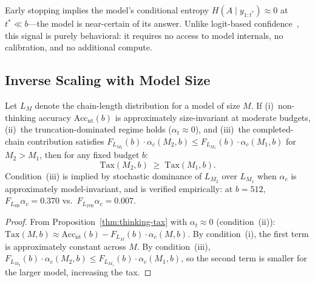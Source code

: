 \begin{remark}
Early stopping implies the model's conditional entropy
$H(A \mid y_{1:t^*}) \approx 0$ at $t^* \ll b$---the model is
near-certain of its answer.
Unlike logit-based confidence~\citep{kadavath2022language}, this signal
is purely behavioral: it requires no access to model internals,
no calibration, and no additional compute.
\end{remark}

\subsection{Inverse Scaling with Model Size}
\label{sec:theory:scaling}

\begin{proposition}
\label{prop:inverse-scaling}
Let $L_M$ denote the chain-length distribution for a model of size $M$.
If (i)~non-thinking accuracy $\mathrm{Acc}_{\mathrm{nt}}(b)$ is approximately
size-invariant at moderate budgets,
(ii)~the truncation-dominated regime holds ($\alpha_t \approx 0$),
and (iii)~the completed-chain contribution satisfies
$F_{L_{M_2}}(b) \cdot \alpha_c(M_2, b) \le F_{L_{M_1}}(b) \cdot \alpha_c(M_1, b)$
for $M_2 > M_1$,
then for any fixed budget $b$:
\begin{equation}
  \mathrm{Tax}(M_2, b) \;\ge\; \mathrm{Tax}(M_1, b).
  \label{eq:inverse-scaling}
\end{equation}
Condition~(iii) is implied by stochastic dominance of $L_{M_2}$ over $L_{M_1}$
when $\alpha_c$ is approximately model-invariant, and is verified
empirically: at $b{=}512$,
$F_{L_{\text{8B}}} \alpha_c = 0.370$ vs.\
$F_{L_{\text{27B}}} \alpha_c = 0.007$.
\end{proposition}

\begin{proof}
From Proposition~\ref{thm:thinking-tax} with $\alpha_t \approx 0$ (condition~(ii)):
$\mathrm{Tax}(M, b) \approx \mathrm{Acc}_{\mathrm{nt}}(b) -
F_{L_M}(b) \cdot \alpha_c(M, b)$.
By condition~(i), the first term is approximately constant across $M$.
By condition~(iii),
$F_{L_{M_2}}(b) \cdot \alpha_c(M_2, b)
\le F_{L_{M_1}}(b) \cdot \alpha_c(M_1, b)$,
so the second term is smaller for the larger model, increasing the tax.
\end{proof}

